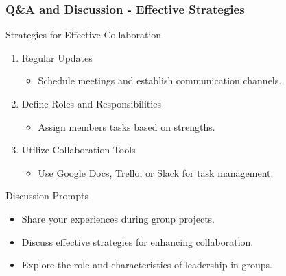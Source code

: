 \documentclass[aspectratio=169]{beamer}
\begin{document}
\begin{frame}[fragile]
    \frametitle{Q\&A and Discussion - Effective Strategies}
    \begin{block}{Strategies for Effective Collaboration}
        \begin{enumerate}
            \item Regular Updates
                \begin{itemize}
                    \item Schedule meetings and establish communication channels.
                \end{itemize}
            \item Define Roles and Responsibilities
                \begin{itemize}
                    \item Assign members tasks based on strengths.
                \end{itemize}
            \item Utilize Collaboration Tools
                \begin{itemize}
                    \item Use Google Docs, Trello, or Slack for task management.
                \end{itemize}
        \end{enumerate}
    \end{block}
    \begin{block}{Discussion Prompts}
        \begin{itemize}
            \item Share your experiences during group projects.
            \item Discuss effective strategies for enhancing collaboration.
            \item Explore the role and characteristics of leadership in groups.
        \end{itemize}
    \end{block}
\end{frame}
\end{document}

